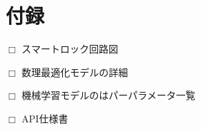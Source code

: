 \section{付録}
  \label{付録}
    \par $\Box$ スマートロック回路図
    \par $\Box$ 数理最適化モデルの詳細
    \par $\Box$ 機械学習モデルのはパーパラメータ一覧
    \par $\Box$ API仕様書
    
